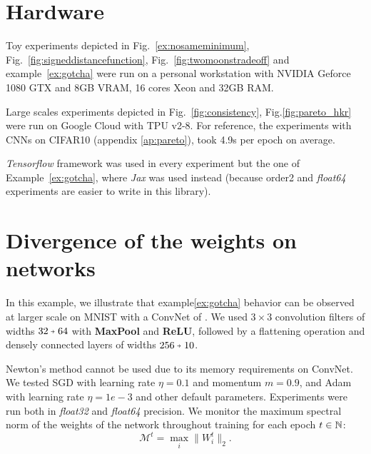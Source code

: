  
%     
    

\section{Hardware}\label{ap:xpsetting}
  
Toy experiments depicted in Fig.~\ref{ex:nosameminimum}, Fig.~\ref{fig:signeddistancefunction}, Fig.~\ref{fig:twomoonstradeoff} and example~\ref{ex:gotcha}  were run on a personal workstation with NVIDIA Geforce 1080 GTX and 8GB VRAM, 16 cores Xeon and 32GB RAM.  
  
Large scales experiments depicted in Fig.~\ref{fig:consistency}, Fig.\ref{fig:pareto_hkr} were run on Google Cloud with TPU v2-8. For reference, the experiments with CNNs on CIFAR10 (appendix  \ref{ap:pareto}), took 4.9s per epoch on average.

\textit{Tensorflow} framework was used in every experiment but the one of Example~\ref{ex:gotcha}, where \textit{Jax} was used instead (because {order2} and \textit{float64} experiments are easier to write in this library).  
  
\section{Divergence of the weights on \LipInf networks}\label{app:divergence}

In this example, we illustrate that example\ref{ex:gotcha} behavior can be observed at larger scale on MNIST with a ConvNet of \LipInf. We used $3\times 3$ convolution filters of widths $32\veryshortarrow 64$ with \textbf{MaxPool} and \textbf{ReLU}, followed by a flattening operation and densely connected layers of widths $256\veryshortarrow 10$.  
  
Newton's method cannot be used due to its memory requirements on ConvNet. We tested SGD with learning rate $\eta=0.1$ and momentum $m=0.9$, and Adam with learning rate $\eta=1e-3$ and other default parameters. Experiments were run both in \textit{float32} and \textit{float64} precision. We monitor the maximum spectral norm of the weights of the network throughout training for each epoch $t\in\mathbb{N}$:
$$\mathcal{M}^t=\max_i\|W^t_i\|_2.$$
  
